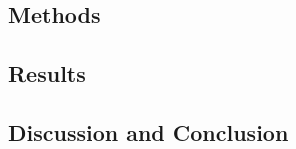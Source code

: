         \subsection{Methods} \label{sec:feasibility_of_neural_network_based_data_driven_surrogate_signal_extraction_methods_for_dynamic_pet_methods}
            
            
        \subsection{Results} \label{sec:feasibility_of_neural_network_based_data_driven_surrogate_signal_extraction_methods_for_dynamic_pet_results}
            
            
        \subsection{Discussion and Conclusion} \label{sec:feasibility_of_neural_network_based_data_driven_surrogate_signal_extraction_methods_for_dynamic_pet_discussion_and_conclusion}
            
